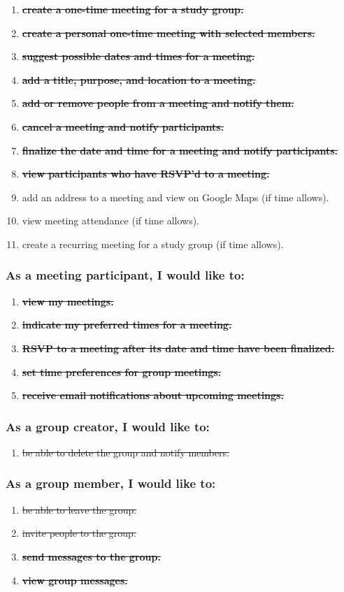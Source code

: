 \documentclass[12pt]{article}
\begin{document}
\begin{enumerate}[nolistsep]
    \item \textbf{\st{create a one-time meeting for a study group.}}
    \item \textbf{\st{create a personal one-time meeting with selected members.}}
    \item \textbf{\st{suggest possible dates and times for a meeting.}}
    \item \textbf{\st{add a title, purpose, and location to a meeting.}}
    \item \textbf{\st{add or remove people from a meeting and notify them.}}
    \item \textbf{\st{cancel a meeting and notify participants.}}
    \item \textbf{\st{finalize the date and time for a meeting and notify participants.}}
    \item \textbf{\st{view participants who have RSVP'd to a meeting.}}
    \item add an address to a meeting and view on Google Maps (if time allows).
    \item view meeting attendance (if time allows).
    \item create a recurring meeting for a study group (if time allows).
\end{enumerate}

\subsubsection*{As a meeting participant, I would like to:}

\begin{enumerate}[nolistsep]
    \item \textbf{\st{view my meetings.}}
    \item \textbf{\st{indicate my preferred times for a meeting.}}
    \item \textbf{\st{RSVP to a meeting after its date and time have been finalized.}}
    \item \textbf{\st{set time preferences for group meetings.}}
    \item \textbf{\st{receive email notifications about upcoming meetings.}}
\end{enumerate}

\subsubsection*{As a group creator, I would like to:}
\begin{enumerate}[nolistsep]
    \item \st{be able to delete the group and notify members.}
\end{enumerate}

\subsubsection*{As a group member, I would like to:}
\begin{enumerate}[nolistsep]
    \item \st{be able to leave the group.}
    \item \st{invite people to the group.}
    \item \textbf{\st{send messages to the group.}}
    \item \textbf{\st{view group messages.}}
\end{enumerate}
\end{document}
